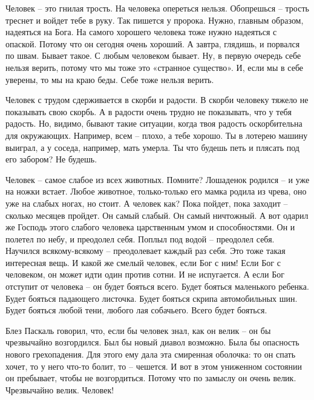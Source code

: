 Человек – это гнилая трость. На человека опереться нельзя. Обопрешься – трость
треснет и войдет тебе в руку. Так пишется у пророка. Нужно, главным образом,
надеяться на Бога. На самого хорошего человека тоже нужно надеяться с опаской.
Потому что он сегодня очень хороший. А завтра, глядишь, и порвался по швам.
Бывает такое. С любым человеком бывает. Ну, в первую очередь себе нельзя
верить, потому что мы тоже это «странное существо». И, если мы в себе уверены,
то мы на краю беды. Себе тоже нельзя верить.

Человек с трудом сдерживается в скорби и радости. В скорби человеку тяжело не
показывать свою скорбь. А в радости очень трудно не показывать, что у тебя
радость. Но, видимо, бывают такие ситуации, когда твоя радость оскорбительна
для окружающих. Например, всем – плохо, а тебе хорошо. Ты в лотерею машину
выиграл, а у соседа, например, мать умерла. Ты что будешь петь и плясать под
его забором? Не будешь.

Человек – самое слабое из всех животных. Помните? Лошаденок родился – и уже на
ножки встает. Любое животное, только-только его мамка родила из чрева, оно уже
на слабых ногах, но стоит. А человек как? Пока пойдет, пока заходит – сколько
месяцев пройдет. Он самый слабый. Он самый ничтожный. А вот одарил же Господь
этого слабого человека царственным умом и способностями. Он и полетел по небу,
и преодолел себя. Поплыл под водой – преодолел себя. Научился всякому-всякому –
преодолевает каждый раз себя. Это тоже такая интересная вещь. И какой же смелый
человек, если Бог с ним! Если Бог с человеком, он может идти один против сотни.
И не испугается. А если Бог отступит от человека – он будет бояться всего.
Будет бояться маленького ребенка. Будет бояться падающего листочка. Будет
бояться скрипа автомобильных шин. Будет бояться любой тени, любого лая
собачьего. Всего будет бояться.

Блез Паскаль говорил, что, если бы человек знал, как он велик – он бы
чрезвычайно возгордился. Был бы новый диавол возможно. Была бы опасность нового
грехопадения. Для этого ему дала эта смиренная оболочка: то он спать хочет, то
у него что-то болит, то – чешется. И вот в этом униженном состоянии он
пребывает, чтобы не возгордиться. Потому что по замыслу он очень велик.
Чрезвычайно велик. Человек!
